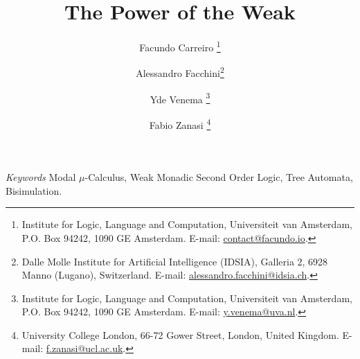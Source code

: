 \documentclass[10pt]{article}
\title{The Power of the Weak}
\author{
Facundo Carreiro
\thanks{Institute for Logic, Language and Computation, Universiteit van Amsterdam,
   P.O. Box 94242, 1090 GE Amsterdam. E-mail: \url{contact@facundo.io}.}
\and Alessandro Facchini\thanks{Dalle Molle Institute for Artificial Intelligence (IDSIA),
Galleria 2, 6928 Manno (Lugano), Switzerland. E-mail: \url{alessandro.facchini@idsia.ch}.}
\and Yde Venema
\thanks{Institute for Logic, Language and Computation, Universiteit van Amsterdam,
   P.O. Box 94242, 1090 GE Amsterdam. E-mail: \url{y.venema@uva.nl}.}
\and Fabio Zanasi
\thanks{University College London,
66-72 Gower Street, London, United Kingdom. E-mail: \url{f.zanasi@ucl.ac.uk}.}
}
\begin{document}
\maketitle



\textit{Keywords}
Modal $\mu$-Calculus, Weak Monadic Second Order Logic, Tree Automata, Bisimulation.

\newpage









{\small 


}
\end{document}
